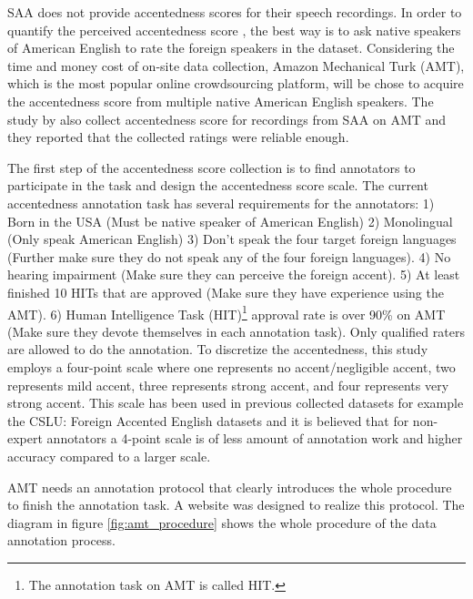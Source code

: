 SAA does not provide accentedness scores for their speech recordings. In order to quantify the perceived accentedness score , the best way is to ask native speakers of American English to rate the foreign speakers in the dataset. Considering the time and money cost of on-site data collection, Amazon Mechanical Turk (AMT), which is the most popular online crowdsourcing platform, will be chose to acquire the accentedness score from multiple native American English speakers. The study by \cite{kunath2010wisdom} also collect accentedness score for recordings from SAA on AMT and they reported that the collected ratings were reliable enough.

The first step of the accentedness score collection is to find annotators to participate in the task and design the accentedness score scale. The current accentedness annotation task has several requirements for the annotators: 1) Born in the USA (Must be native speaker of American English) 2) Monolingual (Only speak American English) 3) Don't speak the four target foreign languages (Further make sure they do not speak any of the four foreign languages). 4) No hearing impairment (Make sure they can perceive the foreign accent). 5) At least finished 10 HITs that are approved (Make sure they have experience using the AMT). 6) Human Intelligence Task (HIT)\footnote{The annotation task on AMT is called HIT.} approval rate is over 90\% on AMT (Make sure they devote themselves in each annotation task). Only qualified raters are allowed to do the annotation. To discretize the accentedness, this study employs a four-point scale where one represents no accent/negligible accent, two represents mild accent, three represents strong accent, and four represents very strong accent. This scale has been used in previous collected datasets for example the CSLU: Foreign Accented English datasets \citep{choueiter2008empirical} and it is believed that for non-expert annotators a 4-point scale is of less amount of annotation work and higher accuracy compared to a larger scale.

AMT needs an annotation protocol that clearly introduces the whole procedure to finish the annotation task. A website was designed to realize this protocol. The diagram in figure \ref{fig:amt_procedure} shows the whole procedure of the data annotation process.

